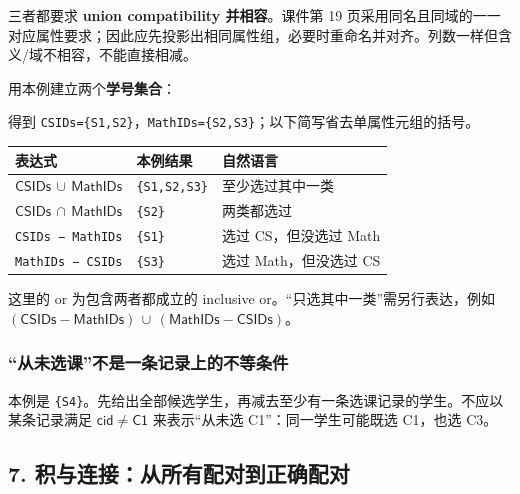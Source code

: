 三者都要求 \textbf{union compatibility 并相容}。课件第 19 页采用同名且同域的一一对应属性要求；因此应先投影出相同属性组，必要时重命名并对齐。列数一样但含义/域不相容，不能直接相减。

用本例建立两个\textbf{学号集合}：


得到 \texttt{CSIDs=\{S1,S2\}}，\texttt{MathIDs=\{S2,S3\}}；以下简写省去单属性元组的括号。

\begin{longtable}[]{@{}lll@{}}
\toprule\noalign{}
表达式 & 本例结果 & 自然语言 \\
\midrule\noalign{}
\endhead
\bottomrule\noalign{}
\endlastfoot
\(\mathsf{CSIDs}\,\cup \,\mathsf{MathIDs}\) & \texttt{\{S1,S2,S3\}} & 至少选过其中一类 \\
\(\mathsf{CSIDs}\,\cap \,\mathsf{MathIDs}\) & \texttt{\{S2\}} & 两类都选过 \\
\texttt{CSIDs\ −\ MathIDs} & \texttt{\{S1\}} & 选过 CS，但没选过 Math \\
\texttt{MathIDs\ −\ CSIDs} & \texttt{\{S3\}} & 选过 Math，但没选过 CS \\
\end{longtable}

这里的 or 为包含两者都成立的 inclusive or。``只选其中一类''需另行表达，例如 \((\mathsf{CSIDs}- \mathsf{MathIDs})\,\cup \,(\mathsf{MathIDs}- \mathsf{CSIDs})\)。

\subsubsection{``从未选课''不是一条记录上的不等条件}\label{05_relational_algebra_zh-ux4eceux672aux9009ux8bfeux4e0dux662fux4e00ux6761ux8bb0ux5f55ux4e0aux7684ux4e0dux7b49ux6761ux4ef6}


本例是 \texttt{\{S4\}}。先给出全部候选学生，再减去至少有一条选课记录的学生。不应以某条记录满足 \(\mathsf{cid}\ne \mathsf{C1}\) 来表示``从未选 C1''：同一学生可能既选 C1，也选 C3。

\subsection{7. 积与连接：从所有配对到正确配对}\label{05_relational_algebra_zh-ux79efux4e0eux8fdeux63a5ux4eceux6240ux6709ux914dux5bf9ux5230ux6b63ux786eux914dux5bf9}

